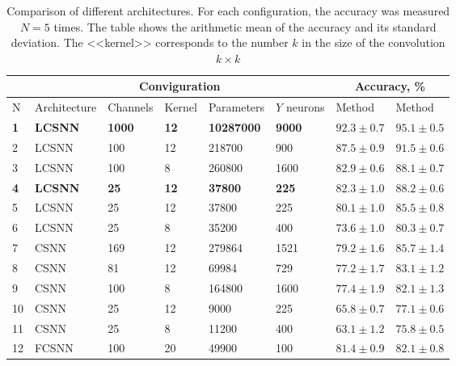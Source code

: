 \documentclass[a4paper,10pt]{article}
\begin{document}
\begin{table}[H]
 \caption{Comparison of different architectures. For each configuration, the accuracy was measured $ N = 5 $ times. The table shows the arithmetic mean of the accuracy and its standard deviation. The <<kernel>> corresponds to the number $ k $ in the size of the convolution $ k \times k $}
\begin{center}
\begin{tabular}{|l|l|l|l|l|l|p{2.2cm}|p{2.2cm}|}
\hline
&\multicolumn{5}{c|}{Conviguration} & \multicolumn{2}{c|}{Accuracy, \%}\\
\hline
N & Architecture & Channels & Kernel & Parameters & $Y$ neurons & {Method \footnotemark[1]} & {Method \footnotemark[2]} \\
\hline\hline
{\textbf{1}} & {\textbf{LCSNN}} & {\textbf{1000}} & {\textbf{12}} & {\textbf{10287000}} & {\textbf{9000}} & {$\mathbf{92.3 \pm 0.7}$} & {$\mathbf{95.1 \pm 0.5}$}\\
\hline
2 & {LCSNN} & {100} & {12} & {218700} & {900} & {$87.5 \pm 0.9$} & {$91.5 \pm 0.6$}\\
\hline
3 & {LCSNN} & {100} & {8} & {260800} & {1600} & {$82.9 \pm 0.6$} & {$88.1 \pm 0.7$}\\
\hline
{\textbf{4}} & {\textbf{LCSNN\footnotemark[3]}} & {\textbf{25}} & {\textbf{12}} & {\textbf{37800}} & {\textbf{225}} & {$\mathbf{82.3 \pm 1.0}$} & {$\mathbf{88.2 \pm 0.6}$}\\
\hline
5 & {LCSNN} & {25} & {12} & {37800} & {225} & {$80.1 \pm 1.0$} & {$85.5 \pm 0.8$}\\
\hline
6 & {LCSNN} & {25} & {8} & {35200} & {400} & {$73.6 \pm 1.0$} & {$80.3 \pm 0.7$}\\
\hline\hline
7 & {CSNN} & {169} & {12} & {279864} & {1521} & {$79.2 \pm 1.6$} & {$85.7 \pm 1.4$}\\
\hline
8 & {CSNN} & {81} & {12} & {69984} & {729} & {$77.2 \pm 1.7$} & {$83.1 \pm 1.2$}\\
\hline
9 & {CSNN} & {100} & {8} & {164800} & {1600} & {$77.4 \pm 1.9$} & {$82.1 \pm 1.3$}\\
\hline
10 & {CSNN} & {25} & {12} & {9000} & {225} & {$65.8 \pm 0.7$} & {$77.1 \pm 0.6$}\\
\hline
11 & {CSNN} & {25} & {8} & {11200} & {400} & {$63.1 \pm 1.2$} & {$75.8 \pm 0.5$}\\
\hline\hline
12 & {FCSNN} & {100} & {20} & {49900} & {100} & {$81.4 \pm 0.9$} & {$82.1 \pm 0.8$}\\
\hline
\end{tabular}
\end{center}
 \label{results}
\end{table}
\end{document}
